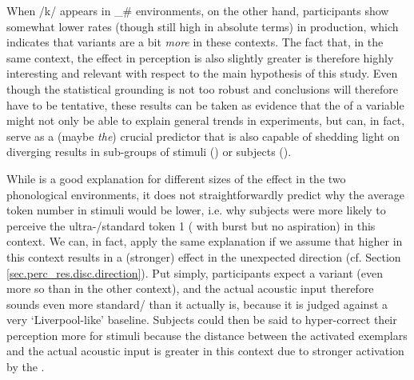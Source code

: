 When /k/ appears in \_\# environments, on the other hand, participants show somewhat lower  rates (though still high in absolute terms) in production, which indicates that  variants are a bit \emph{more}  in these contexts.
The fact that, in the same context, the  effect in perception is also slightly greater is therefore highly interesting and relevant with respect to the main hypothesis of this study.
Even though the statistical grounding is not too robust and conclusions will therefore have to be tentative, these results can be taken as evidence that the  of a variable might not only be able to explain general trends in   experiments, but can, in fact, serve as a (maybe \emph{the}) crucial predictor that is also capable of shedding light on diverging results in sub-groups of stimuli () or subjects ().

While  is a good explanation for different sizes of the  effect in the two phonological environments, it does not straightforwardly predict why the average token number in  stimuli would be lower, i.e. why subjects were more likely to perceive the ultra-/standard token 1 ( with burst but no aspiration) in this context.
We can, in fact, apply the same explanation if we assume that higher  in this context results in a (stronger)  effect in the unexpected direction (cf. Section \ref{sec.perc_res.disc.direction}).
Put simply, participants expect a  variant (even more so than in the other context), and the actual acoustic input therefore sounds even more standard/ than it actually is, because it is judged against a very `Liverpool-like' baseline.
Subjects could then be said to hyper-correct their perception more for  stimuli because the distance between the activated exemplars and the actual acoustic input is greater in this context due to stronger activation by the .

